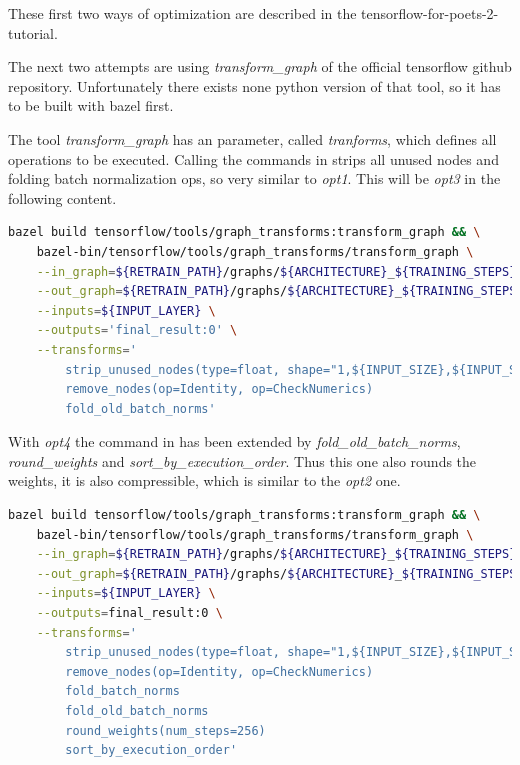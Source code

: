 These first two ways of optimization are described in the tensorflow-for-poets-2-tutorial. 

The next two attempts are using \textit{transform_graph} of the official tensorflow github repository. Unfortunately there exists none python version of that tool, so it has to be built with bazel first. 

The tool \textit{transform_graph} has an parameter, called \textit{tranforms}, which defines all operations to be executed. Calling the commands in  strips all unused nodes and folding batch normalization ops, so very similar to \textit{opt1}. This will be \textit{opt3} in the following content.

\begin{minipage}{\linewidth}
\begin{lstlisting}[caption=Build and call of \textit{transform_graph}, label=list:transform_graph_opt3, language=bash]
	bazel build tensorflow/tools/graph_transforms:transform_graph && \
	bazel-bin/tensorflow/tools/graph_transforms/transform_graph \
	--in_graph=${RETRAIN_PATH}/graphs/${ARCHITECTURE}_${TRAINING_STEPS}/retrained_dog_graph_${ARCHITECTURE}_${TRAINING_STEPS}_${LEARNING_RATE}.pb \
	--out_graph=${RETRAIN_PATH}/graphs/${ARCHITECTURE}_${TRAINING_STEPS}/opt3_retrained_dog_graph_${ARCHITECTURE}_${TRAINING_STEPS}_${LEARNING_RATE}.pb \
	--inputs=${INPUT_LAYER} \
	--outputs='final_result:0' \
	--transforms='
		strip_unused_nodes(type=float, shape="1,${INPUT_SIZE},${INPUT_SIZE},3")
		remove_nodes(op=Identity, op=CheckNumerics)
		fold_old_batch_norms'
\end{lstlisting}
\end{minipage}

With \textit{opt4} the command in \listref{transform_graph_opt4} has been extended by \textit{fold_old_batch_norms}, \textit{round_weights} and \textit{sort_by_execution_order}. Thus this one also rounds the weights, it is also compressible, which is similar to the \textit{opt2} one. 

\begin{minipage}{\linewidth}
\begin{lstlisting}[caption=Build and call of \textit{transform_graph}, label=list:transform_graph_opt4, language=bash]
	bazel build tensorflow/tools/graph_transforms:transform_graph && \
	bazel-bin/tensorflow/tools/graph_transforms/transform_graph \
	--in_graph=${RETRAIN_PATH}/graphs/${ARCHITECTURE}_${TRAINING_STEPS}/retrained_dog_graph_${ARCHITECTURE}_${TRAINING_STEPS}_${LEARNING_RATE}.pb \
	--out_graph=${RETRAIN_PATH}/graphs/${ARCHITECTURE}_${TRAINING_STEPS}/opt4_retrained_dog_graph_${ARCHITECTURE}_${TRAINING_STEPS}_${LEARNING_RATE}.pb \
	--inputs=${INPUT_LAYER} \
	--outputs=final_result:0 \
	--transforms=' 
		strip_unused_nodes(type=float, shape="1,${INPUT_SIZE},${INPUT_SIZE},3")
		remove_nodes(op=Identity, op=CheckNumerics) 
		fold_batch_norms 
		fold_old_batch_norms 
		round_weights(num_steps=256)
		sort_by_execution_order'
\end{lstlisting}
\end{minipage}


